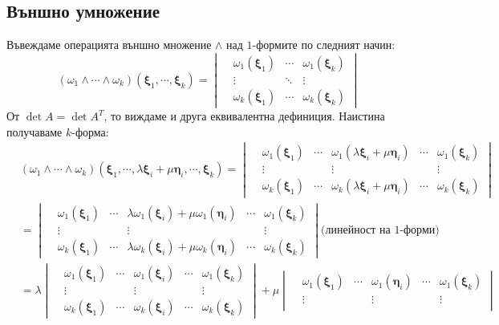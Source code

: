 \documentclass[12pt]{article}
\newcommand\myxi[0]{\boldsymbol{\xi}}
\newcommand\myeta[0]{\boldsymbol{\eta}}
\begin{document}
\begin{large}
  \subsection{Външно умножение}
  Въвеждаме операцията външно множение $\wedge$ над $1$-формите по следният начин:
  \[
    (\omega_1 \wedge \cdots \wedge \omega_k)(\myxi_1,\cdots,\myxi_k)=
    \begin{vmatrix}
      &\omega_1(\myxi_1) &\cdots &\omega_1(\myxi_k) \\
      &\vdots &\ddots &\vdots \\
      &\omega_k(\myxi_1) &\cdots &\omega_k(\myxi_k)
    \end{vmatrix}
  \]
  От $\det A = \det A^T$, то виждаме и друга еквивалентна дефиниция. Наистина получаваме $k$-форма:
  \begin{align*}
    &(\omega_1 \wedge \cdots \wedge \omega_k)(\myxi_1,\cdots,\lambda\myxi_i+\mu\myeta_i,\cdots,\myxi_k)=
    \begin{vmatrix}
      &\omega_1(\myxi_1) &\cdots &\omega_1(\lambda\myxi_i+\mu\myeta_i) &\cdots &\omega_1(\myxi_k) \\
      &\vdots &\ &\vdots &\ &\vdots \\
      &\omega_k(\myxi_1) &\cdots &\omega_k(\lambda\myxi_i+\mu\myeta_i) &\cdots &\omega_k(\myxi_k)
    \end{vmatrix} \\
    &=
    \begin{vmatrix}
      &\omega_1(\myxi_1) &\cdots &\lambda\omega_1(\myxi_i)+\mu\omega_1(\myeta_i) &\cdots &\omega_1(\myxi_k) \\
      &\vdots &\ &\vdots &\ &\vdots \\
      &\omega_k(\myxi_1) &\cdots &\lambda\omega_k(\myxi_i)+\mu\omega_k(\myeta_i) &\cdots &\omega_k(\myxi_k)
    \end{vmatrix} \text{(линейност на $1$-форми)} \\
    &=\lambda
    \begin{vmatrix}
      &\omega_1(\myxi_1) &\cdots &\omega_1(\myxi_i) &\cdots &\omega_1(\myxi_k) \\
      &\vdots &\ &\vdots &\ &\vdots \\
      &\omega_k(\myxi_1) &\cdots &\omega_k(\myxi_i) &\cdots &\omega_k(\myxi_k)
    \end{vmatrix}+\mu
    \begin{vmatrix}
      &\omega_1(\myxi_1) &\cdots &\omega_1(\myeta_i) &\cdots &\omega_1(\myxi_k) \\
      &\vdots &\ &\vdots &\ &\vdots \\

\end{vmatrix}
\end{align*}
\end{large}
\end{document}
